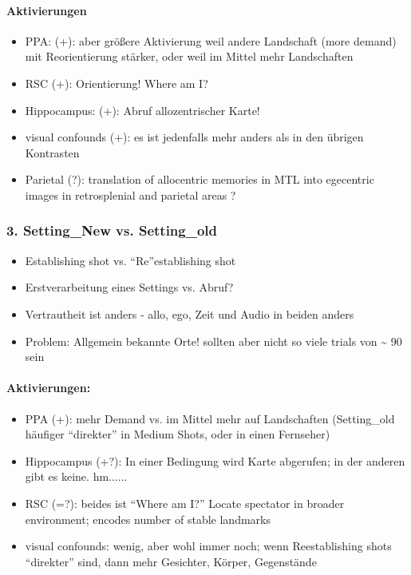 \documentclass[10pt,a4paper,twocolumn]{article}
\begin{document}
\paragraph*{Aktivierungen}
\begin{itemize}
	\item PPA: (+): aber größere Aktivierung weil andere Landschaft (more demand)
	mit Reorientierung stärker, oder weil im Mittel mehr Landschaften 
	\item RSC (+): Orientierung! Where am I?
	\item Hippocampus: (+): Abruf allozentrischer Karte!
	\item visual confounds (+): es ist jedenfalls mehr anders als in den übrigen
	Kontrasten
	\item Parietal (?): translation of allocentric memories in MTL into egecentric
	images in retrosplenial and parietal areas \citep{bird_2012_hippocampus_contraints_imagery}?
\end{itemize}

\subsubsection{3. Setting\_New vs. Setting\_old }
\begin{itemize}
	\item Establishing shot vs. ``Re''establishing shot
	\item Erstverarbeitung eines Settings vs. Abruf?
	\item Vertrautheit ist anders - allo, ego, Zeit und Audio in beiden anders
	\item Problem: Allgemein bekannte Orte! sollten aber nicht so viele trials
	von \textasciitilde{} 90 sein
\end{itemize}

\paragraph*{Aktivierungen:}
\begin{itemize}
	\item PPA (+): mehr Demand vs. im Mittel mehr auf Landschaften (Setting\_old
	häufiger ``direkter'' in Medium Shots, oder in einen Fernseher)
	\item Hippocampus (+?): In einer Bedingung wird Karte abgerufen; in der
	anderen gibt es keine. hm......
	\item RSC (=?): beides ist ``Where am I?'' Locate spectator in broader
	environment; encodes number of stable landmarks
	\item visual confounds: wenig, aber wohl immer noch; wenn Reestablishing
	shots ``direkter'' sind, dann mehr Gesichter, Körper, Gegenstände
\end{itemize}
\end{document}
